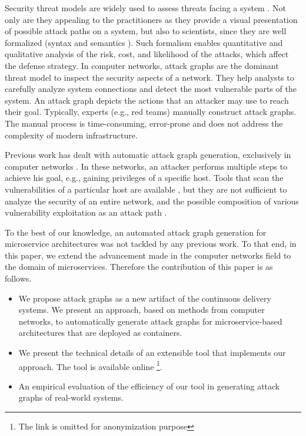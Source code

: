 Security threat models are widely used to assess threats facing a system \cite{kordy2014dag}. Not only are they appealing to the practitioners as they provide a visual presentation of possible attack paths on a system, but also to scientists, since they are well formalized (syntax and semantics \cite{mauw2005foundations,jha2002two}). Such formalism enables quantitative and qualitative analysis of the risk, cost, and likelihood of the attacks, which affect the defense strategy. In computer networks, attack graphs \cite{sheyner2002automated,ou2006scalable} are the dominant threat model to inspect the security aspects of a network. They help analysts to carefully analyze system connections and detect the most vulnerable parts of the system. An attack graph depicts the actions that an attacker may use to reach their goal. Typically, experts (e.g., red teams) manually construct attack graphs. The manual process is time-consuming, error-prone and does not address the complexity of modern infrastructure.  %


Previous work has dealt with automatic attack graph generation, exclusively in computer networks \cite{ingols2006practical, sheyner2002automated, ou2006scalable}. In these networks, an attacker performs multiple steps to achieve his goal, e.g., gaining privileges of a specific host. Tools that scan the vulnerabilities of a particular host are available \cite{farmer1990cops}, but they are not sufficient to analyze the security of an entire network, and the possible composition of various vulnerability exploitation as an attack path \cite{sheyner2002automated}. 

To the best of our knowledge, an automated attack graph generation for microservice architectures was not tackled by any previous work. To that end, in this paper, we extend the advancement made in the computer networks field to the domain of microservices. Therefore the contribution of this paper is as follows.
\begin{itemize}
	\item We propose attack graphs as a new artifact of the continuous delivery systems. We present an approach, based on methods from computer networks, to automatically generate attack graphs for microservice-based architectures that are deployed as containers.   
	\item We present the technical details of an extensible tool that implements our approach. The tool is available online \footnote{The link is omitted for anonymization  purpose}.
	\item An empirical evaluation of the efficiency of our tool in generating attack graphs of real-world systems.
\end{itemize}



